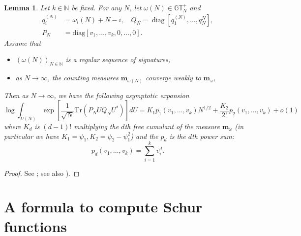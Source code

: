 \documentclass[11pt]{amsart}
\theoremstyle{plain}
\newtheorem{lemma}[theorem]{Lemma}
\theoremstyle{definition}
\theoremstyle{remark}
\newcommand\NN{{\mathbb N}}
\newcommand\GT{\mathbb{G}\mathbb{T}}
\newcommand\bm{\mathbf{m}}
\numberwithin{equation}{section}
\numberwithin{theorem}{section}
\numberwithin{figure}{section}
\begin{document}
\begin{lemma}
  \label{lem:asympexpiz}
  Let $k\in \NN$ be fixed.
  For any $N$, let $\omega(N)\in \GT_N^+$ and
  \begin{align*}
    q_i^{(N)}&=\omega_i(N)+N-i,\quad
    Q_N=\operatorname{diag}\left[q_1^{(N)},\dotsc, q_N^{N}\right],\\
    P_N&=\mathrm{diag}\left[
    v_1,\ldots,v_k,0,\ldots,0\right].
\end{align*}
Assume that 
\begin{itemize}
\item $\left(\omega(N)\right)_{N\in\NN}$ is a regular sequence of signatures,
\item as $N\rightarrow\infty$, the counting measures $\bm_{\omega(N)}$ converge
  weakly to $\bm_{\omega}$,
\end{itemize}
 Then as $N\rightarrow\infty$, we have the following asymptotic expansion
\begin{equation}
\log \int_{U(N)} \exp\left[\frac{1}{\sqrt{N}}\mathrm{Tr}\left(P_NU Q_N U^*\right)\right]dU
= K_1p_1(v_1,\ldots,v_k) N^{1/2} + \frac{K_2}{2!}p_2(v_1,\ldots,v_k)+o(1)
\label{eq:asymptexpiz}
\end{equation}
where $K_d$ is $(d-1)!$ multiplying the $d$th free cumulant of the measure
$\bm_{\omega}$ (in particular we have $K_1=\psi_1, K_2=\psi_2-\psi_1^2$)
and the $p_d$ is the $d$th power sum:
\begin{equation*}
p_d(v_1,\ldots,v_k)=\sum_{i=1}^{k}v_i^d.
\end{equation*}
\end{lemma}

\begin{proof}
  See \cite[Corollary~6]{JN14}; see also
  \cite{ggn}).
\end{proof}

\appendix

\section{A formula to compute Schur functions}\label{sect:A}
\end{document}
